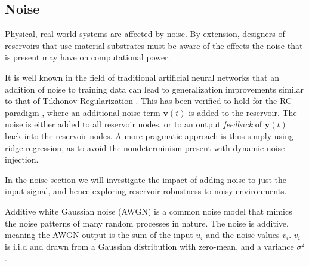 \subsection{Noise}

Physical, real world systems are affected by noise. By extension, designers of
reservoirs that use material substrates must be aware of the effects the noise
that is present may have on computational power.

It is well known in the field of traditional artificial neural networks that an
addition of noise to training data can lead to generalization improvements
similar to that of Tikhonov Regularization \cite{bishop_training_1995}. This has
been verified to hold for the RC paradigm \cite{jaeger_echo_2001,
kurkova_stable_2008}, where an additional noise term $\mathbf{v}(t)$ is added to
the reservoir. The noise is either added to all reservoir nodes, or to an output
\textit{feedback} of $\mathbf{y}(t)$ back into the reservoir nodes. A more
pragmatic approach is thus simply using ridge regression, as to avoid the
nondeterminism present with dynamic noise injection.

In the noise section we will investigate the impact of adding noise to just the
input signal, and hence exploring reservoir robustness to noisy environments.

Additive white Gaussian noise (AWGN) is a common noise model that mimics the
noise patterns of many random processes in nature. The noise is additive,
meaning the AWGN output is the sum of the input $u_{i}$ and the noise values
$v_{i}$. $v_{i}$ is i.i.d and drawn from a Gaussian distribution with zero-mean,
and a variance $\sigma^{2}$.

